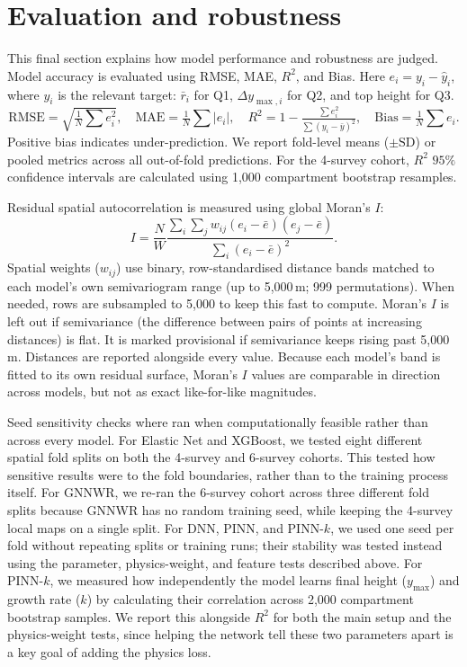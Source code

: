 \documentclass[logo,msc,ai]{infthesis}           %
\begin{document}
\section{Evaluation and robustness} \label{sec:eval-robustness}
This final section explains how model performance and robustness are judged. Model accuracy is evaluated using RMSE, MAE, $R^2$, and Bias. Here $e_i = y_i - \hat y_i$, where $y_i$ is the relevant target: $\bar r_i$ for Q1, $\Delta y_{\max,i}$ for Q2, and top height for Q3.
\begin{equation}
\mathrm{RMSE}=\sqrt{\tfrac{1}{N}\textstyle\sum e_i^2}, \quad
\mathrm{MAE}=\tfrac{1}{N}\textstyle\sum |e_i|, \quad
R^2=1-\tfrac{\sum e_i^2}{\sum (y_i-\bar y)^2}, \quad
\mathrm{Bias}=\tfrac{1}{N}\textstyle\sum e_i.
\label{eq:eval-summary}
\end{equation}
Positive bias indicates under-prediction. We report fold-level means ($\pm\text{SD}$) or pooled metrics across all out-of-fold predictions. For the 4-survey cohort, $R^2$ $95\%$ confidence intervals are calculated using 1,000 compartment bootstrap resamples.

Residual spatial autocorrelation is measured using global Moran's $I$:
\begin{equation}
I=\frac{N}{W}\frac{\sum_i\sum_j w_{ij}(e_i-\bar e)(e_j-\bar e)}{\sum_i(e_i-\bar e)^2}.
\label{eq:morans-i}
\end{equation}
Spatial weights ($w_{ij}$) use binary, row-standardised distance bands matched to each model's own semivariogram range (up to 5,000\,m; 999 permutations). When needed, rows are subsampled to 5,000 to keep this fast to compute. Moran's $I$ is left out if semivariance (the difference between pairs of points at increasing distances) is flat. It is marked provisional if semivariance keeps rising past 5,000\,m. Distances are reported alongside every value. Because each model's band is fitted to its own residual surface, Moran's $I$ values are comparable in direction across models, but not as exact like-for-like magnitudes.

Seed sensitivity checks where ran when computationally feasible rather than across every model. For Elastic Net and XGBoost, we tested eight different spatial fold splits on both the 4-survey and 6-survey cohorts. This tested how sensitive results were to the fold boundaries, rather than to the training process itself. For GNNWR, we re-ran the 6-survey cohort across three different fold splits because GNNWR has no random training seed, while keeping the 4-survey local maps on a single split. For DNN, PINN, and PINN-$k$, we used one seed per fold without repeating splits or training runs; their stability was tested instead using the parameter, physics-weight, and feature tests described above.
For PINN-$k$, we measured how independently the model learns final height ($y_{\max}$) and growth rate ($k$) by calculating their correlation across 2,000 compartment bootstrap samples. We report this alongside $R^2$ for both the main setup and the physics-weight tests, since helping the network tell these two parameters apart is a key goal of adding the physics loss.
\end{document}
